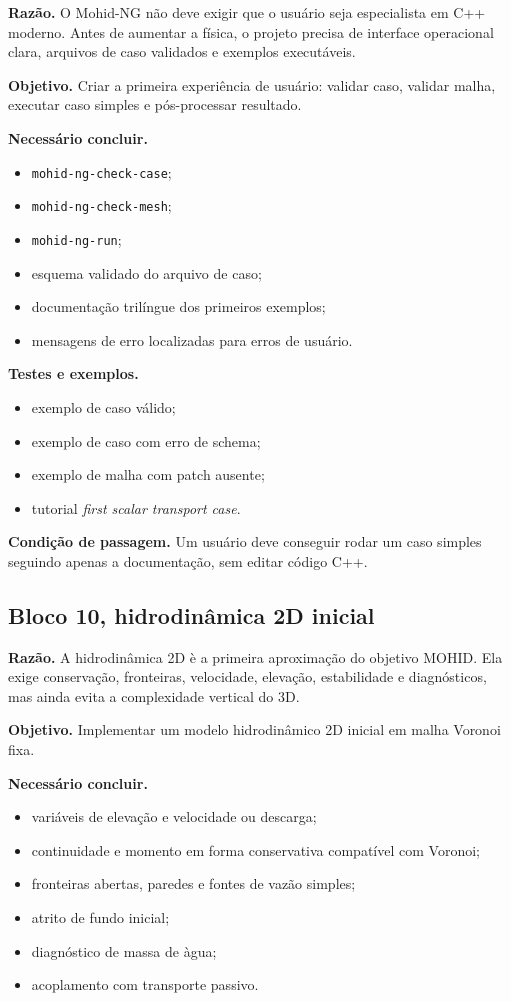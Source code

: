 \documentclass[11pt,a4paper]{article}
\begin{document}
\textbf{Raz\~ao.} O Mohid-NG n\~ao deve exigir que o usu\'ario seja especialista em C++ moderno. Antes de aumentar a f\'isica, o projeto precisa de interface operacional clara, arquivos de caso validados e exemplos execut\'aveis.

\textbf{Objetivo.} Criar a primeira experi\^encia de usu\'ario: validar caso, validar malha, executar caso simples e p\'os-processar resultado.

\textbf{Necess\'ario concluir.}
\begin{itemize}
  \item \texttt{mohid-ng-check-case};
  \item \texttt{mohid-ng-check-mesh};
  \item \texttt{mohid-ng-run};
  \item esquema validado do arquivo de caso;
  \item documenta\c{c}\~ao tril\'ingue dos primeiros exemplos;
  \item mensagens de erro localizadas para erros de usu\'ario.
\end{itemize}

\textbf{Testes e exemplos.}
\begin{itemize}
  \item exemplo de caso v\'alido;
  \item exemplo de caso com erro de schema;
  \item exemplo de malha com patch ausente;
  \item tutorial \emph{first scalar transport case}.
\end{itemize}

\textbf{Condi\c{c}\~ao de passagem.} Um usu\'ario deve conseguir rodar um caso simples seguindo apenas a documenta\c{c}\~ao, sem editar c\'odigo C++.

\subsection*{Bloco 10, hidrodin\^amica 2D inicial}

\textbf{Raz\~ao.} A hidrodin\^amica 2D \`e a primeira aproxima\c{c}\~ao do objetivo MOHID. Ela exige conserva\c{c}\~ao, fronteiras, velocidade, eleva\c{c}\~ao, estabilidade e diagn\'osticos, mas ainda evita a complexidade vertical do 3D.

\textbf{Objetivo.} Implementar um modelo hidrodin\^amico 2D inicial em malha Voronoi fixa.

\textbf{Necess\'ario concluir.}
\begin{itemize}
  \item vari\'aveis de eleva\c{c}\~ao e velocidade ou descarga;
  \item continuidade e momento em forma conservativa compat\'ivel com Voronoi;
  \item fronteiras abertas, paredes e fontes de vaz\~ao simples;
  \item atrito de fundo inicial;
  \item diagn\'ostico de massa de \`agua;
  \item acoplamento com transporte passivo.
\end{itemize}
\end{document}
